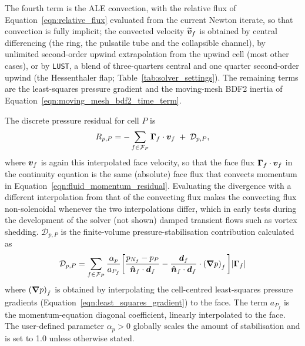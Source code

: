 The fourth term is the ALE convection, with the relative flux of Equation~\eqref{eqn:relative_flux} evaluated from the current Newton iterate, so that convection is fully implicit; the convected velocity $\widetilde{\boldsymbol{v}}_f$ is obtained by central differencing (the ring, the pulsatile tube and the collapsible channel), by unlimited second-order upwind extrapolation from the upwind cell (most other cases), or by \texttt{LUST}, a blend of three-quarters central and one quarter second-order upwind (the Hessenthaler flap; Table~\ref{tab:solver_settings}).
The remaining terms are the least-squares pressure gradient and the moving-mesh BDF2 inertia of Equation~\eqref{eqn:moving_mesh_bdf2_time_term}.

The discrete pressure residual for cell $P$ is
\begin{equation}
    R_{p,P}
    =
    -
    \sum_{f \in \mathcal{F}_P}
    \boldsymbol{\Gamma}_f \cdot \boldsymbol{v}_f
    \;+\;
    \mathcal{D}_{p,P},
    \label{eqn:fluid_pressure_residual}
\end{equation}
where $\boldsymbol{v}_f$ is again this interpolated face velocity, so that the face flux $\boldsymbol{\Gamma}_f \cdot \boldsymbol{v}_f$ in the continuity equation is the same (absolute) face flux that convects momentum in Equation~\eqref{eqn:fluid_momentum_residual}.
Evaluating the divergence with a different interpolation from that of the convecting flux makes the convecting flux non-solenoidal whenever the two interpolations differ, which in early tests during the development of the solver (not shown) damped transient flows such as vortex shedding.
$\mathcal{D}_{p,P}$ is the finite-volume pressure-stabilisation contribution \citep{Rhie1983} calculated as
\begin{eqnarray} \label{eqn:rhie_chow}
	\mathcal{D}_{p,P}
	=
	\sum_{f \in \mathcal{F}_P}
	\frac{\alpha_p}{a_{P_f}}
        \bigg[
	\frac{p_{N_f} - p_{P}}{\boldsymbol{\hat{n}}_f \cdot \boldsymbol{d}_f}
       -
       \frac{\boldsymbol{d}_f}{\boldsymbol{\hat{n}}_f \cdot \boldsymbol{d}_f} \cdot \left( \boldsymbol{\nabla} p \right)_f
    \bigg]
    |\boldsymbol{\Gamma}_f|
\end{eqnarray}
where $\left( \boldsymbol{\nabla} p \right)_f$ is obtained by interpolating the cell-centred least-squares pressure gradients (Equation~\eqref{eqn:least_squares_gradient}) to the face.
The term $a_{P_f}$ is the momentum-equation diagonal coefficient, linearly interpolated to the face.
The user-defined parameter $\alpha_p > 0$ globally scales the amount of stabilisation and is set to 1.0 unless otherwise stated.

